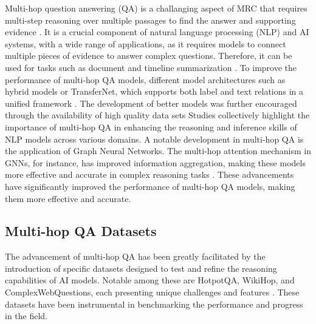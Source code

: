 \documentclass[sigplan,screen]{acmart}
\begin{document}
Multi-hop question answering (QA) is a challanging aspect of MRC that requires multi-step reasoning over multiple passages to find the answer and supporting evidence \cite{RN165}.
It is a crucial component of natural language processing (NLP) and AI systems, with a wide range of applications, as it requires models to connect multiple pieces of 
evidence to answer complex questions. Therefore, it can be used for tasks such as document and timeline summarization \cite{RN202} \cite{RN201}.
To improve the performance of multi-hop QA models, different model architectures such as hybrid models or TransferNet, which supports both label and text relations in a unified framework \cite{RN164} \cite{RN133}. 
The development of better models was further encouraged through the availability of high quality data sets \cite{RN116} \cite{RN115}
Studies collectively highlight the importance of multi-hop QA in enhancing the reasoning and inference skills of NLP models across various domains. 
A notable development in multi-hop QA is the application of Graph Neural Networks. The multi-hop attention mechanism in GNNs, for instance, has improved information aggregation, making these 
models more effective and accurate in complex reasoning tasks \cite{RN109}. These advancements have significantly improved the performance of multi-hop QA models, making them more effective and accurate.

\subsection{Multi-hop QA Datasets}
The advancement of multi-hop QA has been greatly facilitated by the introduction of specific datasets designed to test and refine the reasoning capabilities of AI models. 
Notable among these are HotpotQA, WikiHop, and ComplexWebQuestions, each presenting unique challenges and features \cite{RN115}\cite{RN116}\cite{RN104}.
These datasets have been instrumental in benchmarking the performance and progress in the field. 
\end{document}
